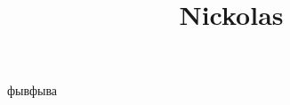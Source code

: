 \documentclass[12pt]{amsart}
\title{Nickolas}
\author{}
\date{} %
\begin{document}
\maketitle
\tableofcontents

\section{}
\subsection{}
фывфыва
\end{document}
